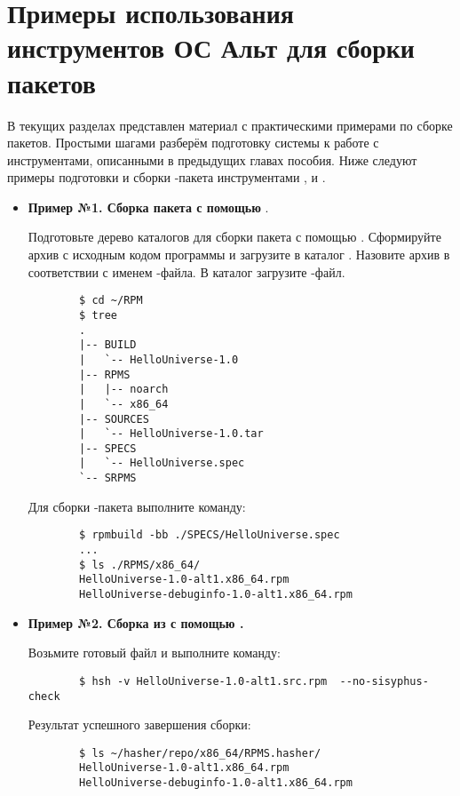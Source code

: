 \chapter{Примеры использования инструментов ОС Альт для сборки пакетов}

В текущих разделах представлен материал с практическими примерами по сборке пакетов. Простыми шагами разберём подготовку системы к работе с инструментами, описанными в предыдущих главах пособия. Ниже следуют примеры подготовки и сборки -пакета инструментами ,  и .

\begin{itemize}
	\item \textbf{Пример №1. Сборка пакета с помощью }.
	
	Подготовьте дерево каталогов для сборки пакета с помощью . Сформируйте  архив с исходным кодом программы и загрузите в каталог . Назовите архив в соответствии с именем -файла. В каталог  загрузите -файл. 
	
	\begin{verbatim}
		$ cd ~/RPM
		$ tree
		.
		|-- BUILD
		|   `-- HelloUniverse-1.0
		|-- RPMS
		|   |-- noarch
		|   `-- x86_64
		|-- SOURCES
		|   `-- HelloUniverse-1.0.tar
		|-- SPECS
		|   `-- HelloUniverse.spec
		`-- SRPMS
	\end{verbatim}
	
	Для сборки -пакета выполните команду: 
	\begin{verbatim}
		$ rpmbuild -bb ./SPECS/HelloUniverse.spec 
		...
		$ ls ./RPMS/x86_64/
		HelloUniverse-1.0-alt1.x86_64.rpm
		HelloUniverse-debuginfo-1.0-alt1.x86_64.rpm
	\end{verbatim}
	
	\item \textbf{Пример №2. Сборка из  с помощью .}
	
	Возьмите готовый файл  и выполните команду:
	\begin{verbatim}
		$ hsh -v HelloUniverse-1.0-alt1.src.rpm  --no-sisyphus-check
	\end{verbatim} 
	
	Результат успешного завершения сборки: 
	\begin{verbatim}
		$ ls ~/hasher/repo/x86_64/RPMS.hasher/
		HelloUniverse-1.0-alt1.x86_64.rpm
		HelloUniverse-debuginfo-1.0-alt1.x86_64.rpm
	\end{verbatim}
	

\end{itemize}
